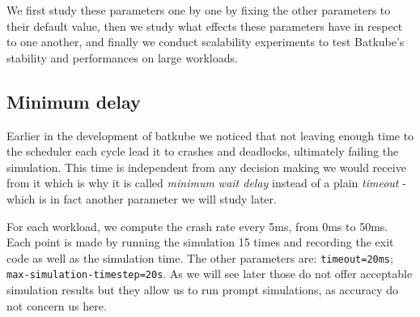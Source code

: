 \documentclass[12pt, a4paper]{memoir}
\begin{document}
We first study these parameters one by one by fixing the other parameters to
their default value, then we study what effects these parameters have in
respect to one another, and finally we conduct scalability experiments to test
Batkube's stability and performances on large workloads.

\subsection{Minimum delay}

Earlier in the development of batkube we noticed that not leaving enough time
to the scheduler each cycle lead it to crashes and deadlocks, ultimately
failing the simulation. This time is independent from any decision making we
would receive from it which is why it is called \textit{minimum wait delay}
instead of a plain \textit{timeout} - which is in fact another parameter we
will study later.

For each workload, we compute the crash rate every 5ms, from 0ms to 50ms. Each
point is made by running the simulation 15 times and recording the exit code as
well as the simulation time. The other parameters are: \texttt{timeout=20ms};
\texttt{max-simulation-timestep=20s}. As we will see later those do not offer
acceptable simulation results but they allow us to run prompt simulations, as
accuracy do not concern us here.\\
\end{document}
